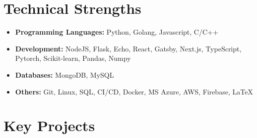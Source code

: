 \documentclass[11pt,a4paper,calibri]{moderncv}        %
\begin{document}
	\vspace{-12pt}
	\section{Technical Strengths}
	
	\begin{itemize}[leftmargin=.2in]
		\setlength\itemsep{.2em}
		
		\item \textbf{Programming Languages:} Python, Golang, Javascript, C/C++
		\vspace{-4pt}
		\item \textbf{Development:} NodeJS, Flask, Echo, React, Gatsby, Next.js, TypeScript, Pytorch, Scikit-learn, Pandas, Numpy
		\vspace{-4pt}
		\item \textbf{Databases:} MongoDB, MySQL
		\vspace{-4pt}
		\item \textbf{Others:} Git, Linux, SQL, CI/CD, Docker, MS Azure, AWS, Firebase, \LaTeX
		
	\end{itemize}
	
	\vspace{-15pt}
	\section{Key Projects}
	
\end{document}
